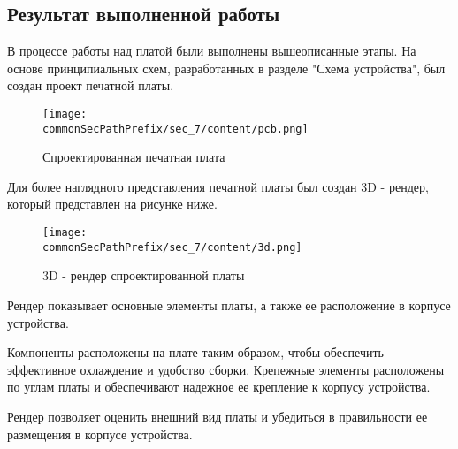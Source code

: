 \subsection{Результат выполненной работы}

В процессе работы над платой были выполнены вышеописанные этапы. На основе принципиальных схем, разработанных в разделе "Схема устройства", был создан проект печатной платы\cite{altium_docs}.
\begin{figure}[ht]
    \centering
    \texttt{[image: \\commonSecPathPrefix/sec\_7/content/pcb.png]}
    \caption{Спроектированная печатная плата}
\end{figure}
Для более наглядного представления печатной платы был создан 3D - рендер, который представлен на рисунке ниже.
\begin{figure}[ht]
    \centering
    \texttt{[image: \\commonSecPathPrefix/sec\_7/content/3d.png]}
    \caption{3D - рендер спроектированной платы}
\end{figure}
Рендер показывает основные элементы платы, а также ее расположение в корпусе устройства.


Компоненты расположены на плате таким образом, чтобы обеспечить эффективное охлаждение и удобство сборки. Крепежные элементы расположены по углам платы и обеспечивают надежное ее крепление к корпусу устройства.


Рендер позволяет оценить внешний вид платы и убедиться в правильности ее размещения в корпусе устройства.